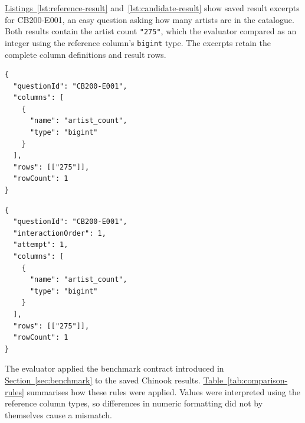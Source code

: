 \hyperref[lst:reference-result]{Listings~\ref*{lst:reference-result}} and~\ref{lst:candidate-result} show saved
result excerpts for CB200-E001, an easy question asking how many artists are
in the catalogue.
Both results contain the artist count \texttt{"275"}, which the evaluator
compared as an integer using the reference column's \texttt{bigint} type.
The excerpts retain the complete column definitions and result rows.

\noindent\begin{minipage}{\linewidth}
\begin{minipage}[t]{0.48\linewidth}
\begin{lstlisting}[caption={Reference result excerpt for CB200-E001 (Source: Author, 2026).},label={lst:reference-result},captionpos=b]
{
  "questionId": "CB200-E001",
  "columns": [
    {
      "name": "artist_count",
      "type": "bigint"
    }
  ],
  "rows": [["275"]],
  "rowCount": 1
}
\end{lstlisting}
\end{minipage}\hfill
\begin{minipage}[t]{0.48\linewidth}
\begin{lstlisting}[caption={Candidate result excerpt for CB200-E001, Haiku repetition 1 (Source: Author, 2026).},label={lst:candidate-result},captionpos=b]
{
  "questionId": "CB200-E001",
  "interactionOrder": 1,
  "attempt": 1,
  "columns": [
    {
      "name": "artist_count",
      "type": "bigint"
    }
  ],
  "rows": [["275"]],
  "rowCount": 1
}
\end{lstlisting}
\end{minipage}
\end{minipage}

The evaluator applied the benchmark contract introduced in
\hyperref[sec:benchmark]{Section~\ref*{sec:benchmark}} to the saved Chinook results.
\hyperref[tab:comparison-rules]{Table~\ref*{tab:comparison-rules}}
summarises how these rules were applied.
Values were interpreted using the
reference column types, so differences in numeric formatting did not by
themselves cause a mismatch.

